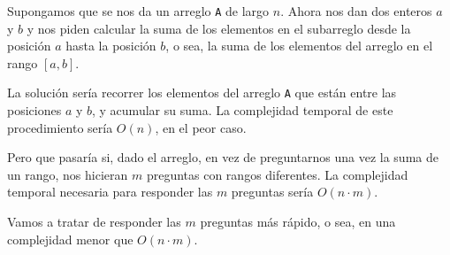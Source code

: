 Supongamos que se nos da un arreglo \texttt{A} de largo $n$. Ahora nos dan dos enteros $a$ y $b$ y nos piden calcular la suma de los elementos en el subarreglo desde la posici\'on $a$ hasta la posici\'on $b$, o sea, la suma de los elementos del arreglo en el rango $[a, b]$.

La soluci\'on ser\'ia recorrer los elementos del arreglo \texttt{A} que est\'an entre las posiciones $a$ y $b$, y acumular su suma. La complejidad temporal de este procedimiento ser\'ia $O(n)$, en el peor caso. 

Pero que pasar\'ia si, dado el arreglo, en vez de preguntarnos una vez la suma de un rango, nos hicieran $m$ preguntas con rangos diferentes. La complejidad temporal necesaria para responder las $m$ preguntas ser\'ia $O(n \cdot m)$.

Vamos a tratar de responder las $m$ preguntas m\'as r\'apido, o sea, en una complejidad menor que $O(n \cdot m)$.
